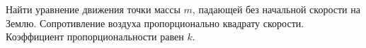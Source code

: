 Найти уравнение движения точки массы $m$, падающей без начальной
скорости на Землю. Сопротивление воздуха пропорционально квадрату
скорости. Коэффициент пропорциональности равен $k$.
